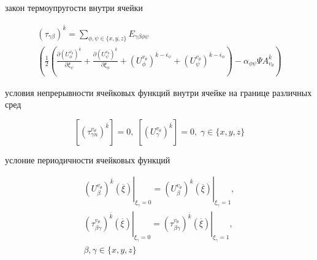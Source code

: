 закон термоупругости внутри ячейки

\begin{equation}
    \label{elhp:eq29}
    \begin{gathered}
    \left( \tau_{ \gamma\beta} \right)^{ \overline{k} } =
    \sum_{ \phi,\psi \in \{x,y,z\}} E_{ \gamma\beta\phi\psi}
    \\
    \left( \frac{1}{2} 
        \left( 
            \frac{\partial \left( U_{\phi}^{v_{\theta}}\right)^{ \overline{k} }}{\partial \xi_{\psi}} +
            \frac{\partial \left( U_{\psi}^{v_{\theta}}\right)^{ \overline{k} }}{\partial \xi_{\phi}} +
            \left( U_{\phi}^{v_{\theta}}\right)^{ \overline{k} - \overline{\epsilon}_{\psi}  } +
            \left( U_{\psi}^{v_{\theta}}\right)^{ \overline{k} - \overline{\epsilon}_{\phi}  }
        \right) 
        - \alpha_{\phi\psi} \Psi A_{v_{\theta}}^{ \overline{k} }
    \right) 
    \end{gathered}
\end{equation}

условия непрерывности ячейковых функций внутри ячейке на границе различных сред

\begin{equation}
    \label{elhp:eq30}
    \left[ \left( \tau_{ \gamma n}^{v_{\theta}} \right)^{ \overline{k} }  \right] = 0
    ,\;
    \left[ \left( U_{ \gamma}^{v_{\theta}} \right)^{ \overline{k} }  \right] = 0
    ,\;
    \gamma \in \{x,y,z\} 
\end{equation}

услоние периодичности ячейковых функций

\begin{equation}
    \label{elhp:eq70}
    \begin{gathered}
    \left.   
    \left( U_{\beta}^{ v_{\theta}} \right)^{ \overline{k}}
    \left( \overline{\xi}  \right) 
    \right|_{\xi_{\gamma}=0}
    =
    \left.   
    \left( U_{\beta}^{ v_{\theta}} \right)^{ \overline{k}}
    \left( \overline{\xi}  \right) 
    \right|_{\xi_{\gamma}=1}
    ,
    \\
    \left.   
    \left( \tau_{\beta\gamma}^{ v_{\theta}} \right)^{ \overline{k}}
    \left( \overline{\xi}  \right) 
    \right|_{\xi_{\gamma}=0}
    =
    \left.   
    \left( \tau_{\beta\gamma}^{ v_{\theta}} \right)^{ \overline{k}}
    \left( \overline{\xi}  \right) 
    \right|_{\xi_{\gamma}=1},
    \\
    \beta,\gamma \in \{x,y,z\} 
    \end{gathered}
\end{equation}

